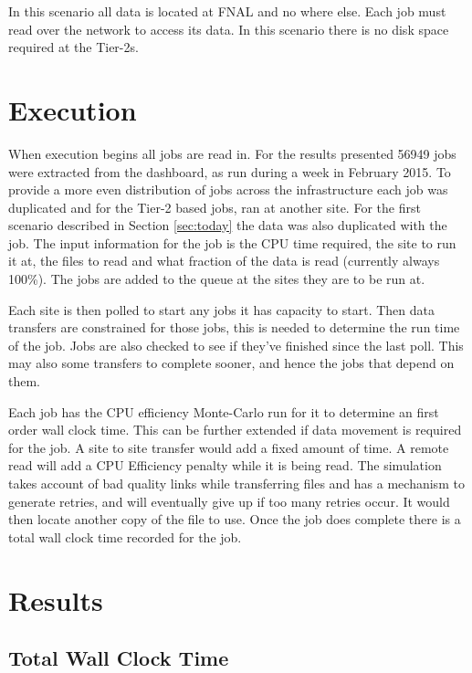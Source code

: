 \documentclass[a4paper]{jpconf}
\begin{document}
In this scenario all data is located at FNAL and no where else. Each
job must read over the network to access its data. In this scenario
there is no disk space required at the Tier-2s.

\section{Execution}

When execution begins all jobs are read in. For the results presented
56949 jobs were extracted from the dashboard, as run during a week in
February 2015. To provide a more even distribution of jobs across the
infrastructure each job was duplicated and for the Tier-2 based jobs,
ran at another site. For the first scenario described in Section
\ref{sec:today} the data was also duplicated with the job. The input
information for the job is the CPU time required, the site to run it
at, the files to read and what fraction of the data is read (currently
always 100\%). The jobs are added to the queue at the sites they are
to be run at.

Each site is then polled to start any jobs it has capacity to
start. Then data transfers are constrained for those jobs, this is
needed to determine the run time of the job. Jobs are also checked to
see if they've finished since the last poll. This may also some
transfers to complete sooner, and hence the jobs that depend on them.

Each job has the CPU efficiency Monte-Carlo run for it to determine an
first order wall clock time. This can be further extended if data
movement is required for the job. A site to site transfer would add a
fixed amount of time. A remote read will add a CPU Efficiency penalty
while it is being read. The simulation takes account of bad quality
links while transferring files and has a mechanism to generate retries,
and will eventually give up if too many retries occur. It would then
locate another copy of the file to use. Once the job does complete
there is a total wall clock time recorded for the job.

\section{Results}

\subsection{Total Wall Clock Time}
\end{document}
